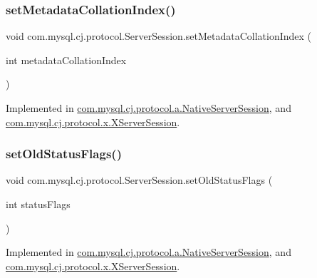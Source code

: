 \subsubsection{\texorpdfstring{set\+Metadata\+Collation\+Index()}{setMetadataCollationIndex()}}
{\footnotesize\ttfamily void com.\+mysql.\+cj.\+protocol.\+Server\+Session.\+set\+Metadata\+Collation\+Index (\begin{DoxyParamCaption}\item[{int}]{metadata\+Collation\+Index }\end{DoxyParamCaption})}



Implemented in \mbox{\hyperlink{classcom_1_1mysql_1_1cj_1_1protocol_1_1a_1_1_native_server_session_ac50b43fb6e344f4b040cad7131f84ed6}{com.\+mysql.\+cj.\+protocol.\+a.\+Native\+Server\+Session}}, and \mbox{\hyperlink{classcom_1_1mysql_1_1cj_1_1protocol_1_1x_1_1_x_server_session_a6f374cd57560302ea8fdeaa141227cae}{com.\+mysql.\+cj.\+protocol.\+x.\+X\+Server\+Session}}.

\mbox{\label{interfacecom_1_1mysql_1_1cj_1_1protocol_1_1_server_session_a8ca3607d493b411a09825465bf202eda}} 
\subsubsection{\texorpdfstring{set\+Old\+Status\+Flags()}{setOldStatusFlags()}}
{\footnotesize\ttfamily void com.\+mysql.\+cj.\+protocol.\+Server\+Session.\+set\+Old\+Status\+Flags (\begin{DoxyParamCaption}\item[{int}]{status\+Flags }\end{DoxyParamCaption})}



Implemented in \mbox{\hyperlink{classcom_1_1mysql_1_1cj_1_1protocol_1_1a_1_1_native_server_session_a1fc54902245f1c34539d27846fa5e211}{com.\+mysql.\+cj.\+protocol.\+a.\+Native\+Server\+Session}}, and \mbox{\hyperlink{classcom_1_1mysql_1_1cj_1_1protocol_1_1x_1_1_x_server_session_aff18996cbbfff84c6770377bc60d2225}{com.\+mysql.\+cj.\+protocol.\+x.\+X\+Server\+Session}}.

